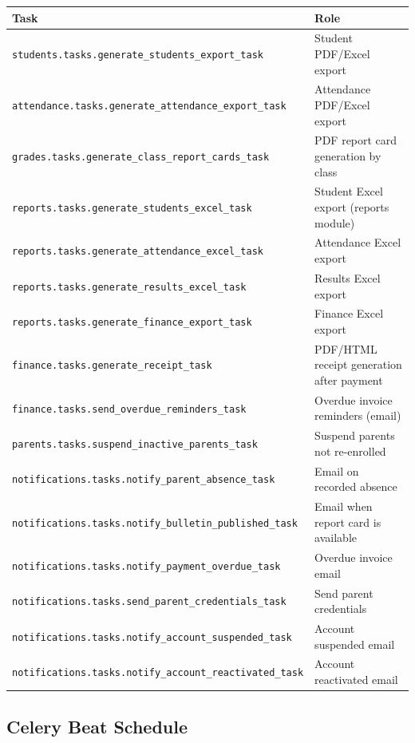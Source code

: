 \documentclass[11pt,a4paper]{article}
\begin{document}
\begin{longtable}{@{}lp{9cm}@{}}
\toprule
\textbf{Task} & \textbf{Role} \\
\midrule
\endhead
\texttt{students.tasks.generate\_students\_export\_task} & Student PDF/Excel export \\
\texttt{attendance.tasks.generate\_attendance\_export\_task} & Attendance PDF/Excel export \\
\texttt{grades.tasks.generate\_class\_report\_cards\_task} & PDF report card generation by class \\
\texttt{reports.tasks.generate\_students\_excel\_task} & Student Excel export (reports module) \\
\texttt{reports.tasks.generate\_attendance\_excel\_task} & Attendance Excel export \\
\texttt{reports.tasks.generate\_results\_excel\_task} & Results Excel export \\
\texttt{reports.tasks.generate\_finance\_export\_task} & Finance Excel export \\
\texttt{finance.tasks.generate\_receipt\_task} & PDF/HTML receipt generation after payment \\
\texttt{finance.tasks.send\_overdue\_reminders\_task} & Overdue invoice reminders (email) \\
\texttt{parents.tasks.suspend\_inactive\_parents\_task} & Suspend parents not re-enrolled \\
\texttt{notifications.tasks.notify\_parent\_absence\_task} & Email on recorded absence \\
\texttt{notifications.tasks.notify\_bulletin\_published\_task} & Email when report card is available \\
\texttt{notifications.tasks.notify\_payment\_overdue\_task} & Overdue invoice email \\
\texttt{notifications.tasks.send\_parent\_credentials\_task} & Send parent credentials \\
\texttt{notifications.tasks.notify\_account\_suspended\_task} & Account suspended email \\
\texttt{notifications.tasks.notify\_account\_reactivated\_task} & Account reactivated email \\
\bottomrule
\end{longtable}

\subsection{Celery Beat Schedule}
\end{document}
